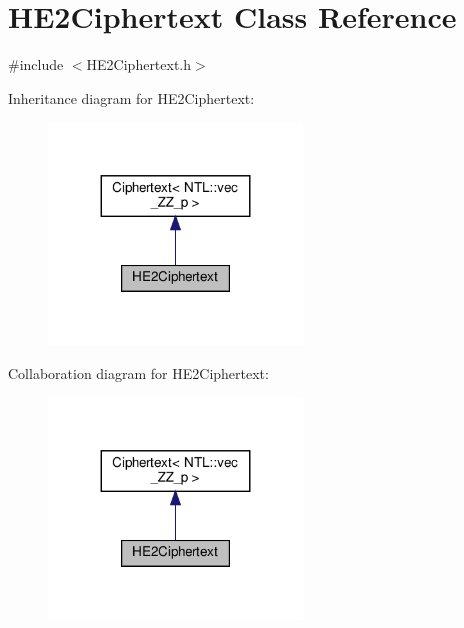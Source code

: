 \hypertarget{classHE2Ciphertext}{}\section{H\+E2\+Ciphertext Class Reference}
\label{classHE2Ciphertext}


{\ttfamily \#include $<$H\+E2\+Ciphertext.\+h$>$}



Inheritance diagram for H\+E2\+Ciphertext\+:
\nopagebreak
\begin{figure}[H]
\begin{center}
\leavevmode
\includegraphics[width=191pt]{classHE2Ciphertext__inherit__graph}
\end{center}
\end{figure}


Collaboration diagram for H\+E2\+Ciphertext\+:
\nopagebreak
\begin{figure}[H]
\begin{center}
\leavevmode
\includegraphics[width=191pt]{classHE2Ciphertext__coll__graph}
\end{center}
\end{figure}
